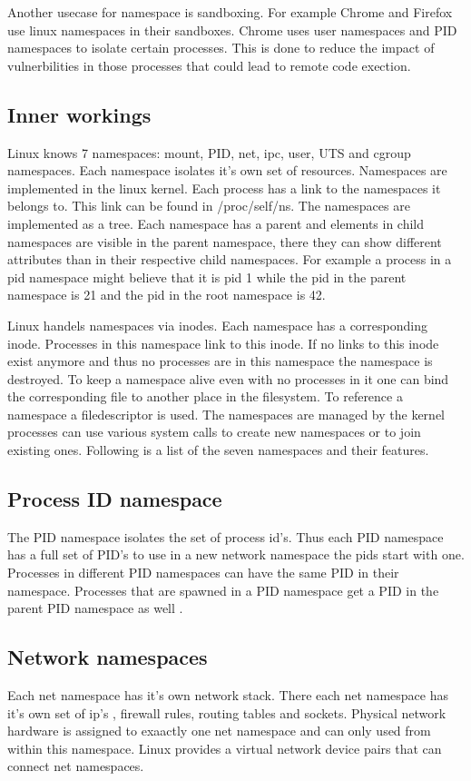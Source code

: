 \documentclass[10pt,twocolumn,a4paper]{article}
\begin{document}
Another usecase for namespace is sandboxing. For example Chrome  and Firefox use linux namespaces in their sandboxes. 
Chrome uses user namespaces and PID namespaces to isolate certain processes.
This is done to reduce the impact of vulnerbilities in those processes that could lead to remote code exection.


\subsection{Inner workings}
Linux knows 7 namespaces: mount, PID, net, ipc, user, UTS and cgroup namespaces. Each namespace
isolates it's own set of resources. Namespaces are implemented in the linux kernel.
Each process has a link to the namespaces it belongs to. This link can be found in
/proc/self/ns\cite{8}. The namespaces are implemented as a tree. Each namespace has a parent and 
elements in child namespaces are visible in the parent namespace, there they can show different
attributes than in their respective child namespaces. For example a process in a pid namespace might 
believe that it is pid 1 while the pid in the parent namespace is 21 and the pid in the root namespace is 42.

Linux handels namespaces via inodes. Each namespace has a corresponding inode. Processes in this
namespace link to this inode. If no links to this inode exist anymore and thus no processes are in
this namespace the namespace is destroyed. To keep a namespace alive even with no processes in it
one can bind the corresponding file to another place in the filesystem. To reference a namespace a
filedescriptor is used. The namespaces are managed by the kernel processes can use various system
calls to create new namespaces or to join existing ones.\cite{8} Following is a list of the seven
namespaces and their features.


\subsection{Process ID namespace}
The PID namespace isolates the set of process id's. 
Thus each PID namespace has a full set of PID's to use in a new network namespace the pids start
with one.
Processes in different PID namespaces can have the same PID in their namespace. 
Processes that are spawned in a PID namespace get a PID in the parent PID namespace as well 
\cite{11}.

\subsection{Network namespaces}
Each net namespace has it's own network stack. There each net namespace has it's own set of ip's ,
firewall rules, routing tables and sockets. Physical network hardware is assigned to exaactly one
net namespace and can only used from within this namespace. Linux provides a virtual network device
pairs that can connect net namespaces.\cite{10}
\end{document}
